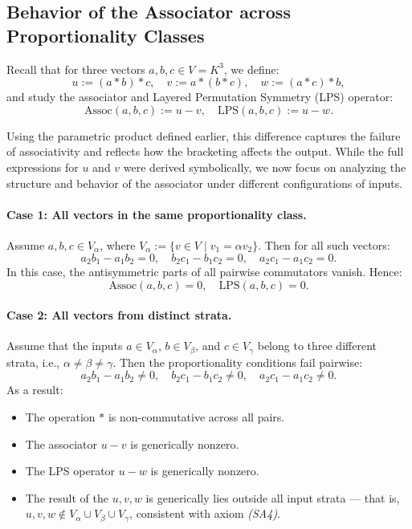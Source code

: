 \documentclass[12pt]{article}
\theoremstyle{definition}
\theoremstyle{plain}
\theoremstyle{remark}
\begin{document}
\subsection{Behavior of the Associator across Proportionality Classes}

Recall that for three vectors \( a, b, c \in V = K^3 \), we define:
\[
u := (a * b) * c, \quad v := a * (b * c), \quad w := (a * c) * b,
\]
and study the associator and Layered Permutation Symmetry (LPS) operator:
\[
\mathrm{Assoc}(a, b, c) := u - v, \quad \mathrm{LPS}(a, b, c) := u - w.
\]

Using the parametric product defined earlier, this difference captures the failure of associativity and reflects how the bracketing affects the output. While the full expressions for \( u \) and \( v \) were derived symbolically, we now focus on analyzing the structure and behavior of the associator under different configurations of inputs.

\paragraph{Case 1: All vectors in the same proportionality class.}

Assume \( a, b, c \in V_\alpha \), where \( V_\alpha := \{ v \in V \mid v_1 = \alpha v_2 \} \). Then for all such vectors:
\[
a_2 b_1 - a_1 b_2 = 0, \quad b_2 c_1 - b_1 c_2 = 0, \quad a_2 c_1 - a_1 c_2 = 0.
\]
In this case, the antisymmetric parts of all pairwise commutators vanish. Hence:
\[
\mathrm{Assoc}(a, b, c) = 0, \quad \mathrm{LPS}(a, b, c) = 0.
\]

\paragraph{Case 2: All vectors from distinct strata.}

Assume that the inputs \( a \in V_\alpha \), \( b \in V_\beta \), and \( c \in V_\gamma \) belong to three different strata, i.e., \( \alpha \ne \beta \ne \gamma \). Then the proportionality conditions fail pairwise:
\[
a_2 b_1 - a_1 b_2 \ne 0, \quad b_2 c_1 - b_1 c_2 \ne 0, \quad a_2 c_1 - a_1 c_2 \ne 0.
\]
As a result:
\begin{itemize}
    \item The operation \( * \) is non-commutative across all pairs.
    \item The associator \( u - v \) is generically nonzero.
    \item The LPS operator \( u - w \) is generically nonzero.
    \item The result of the \( u, v, w \) is generically lies outside all input strata — that is, \( u, v, w \notin V_\alpha \cup V_\beta \cup V_\gamma \), consistent with axiom \emph{(SA4)}.
\end{itemize}
\end{document}
